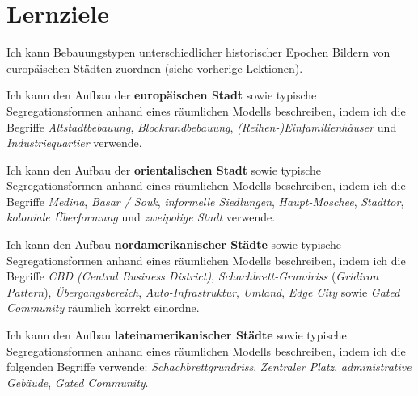 \newpage
\section{Lernziele}
\begin{todolist}
\item Ich kann Bebauungstypen unterschiedlicher historischer Epochen Bildern von europäischen Städten zuordnen (siehe vorherige Lektionen).
\item Ich kann den Aufbau der \textbf{europäischen Stadt} sowie typische Segregationsformen anhand eines räumlichen Modells beschreiben, indem ich die Begriffe \textit{Altstadtbebauung}, \textit{Blockrandbebauung}, \textit{(Reihen-)Einfamilienhäuser} und \textit{Industriequartier} verwende.
\item Ich kann den Aufbau der \textbf{orientalischen Stadt} sowie typische Segregationsformen anhand eines räumlichen Modells beschreiben, indem ich die Begriffe \textit{Medina}, \textit{Basar / Souk}, \textit{informelle Siedlungen}, \textit{Haupt-Moschee}, \textit{Stadttor}, \textit{koloniale Überformung} und \textit{zweipolige Stadt} verwende.
\item Ich kann den Aufbau \textbf{nordamerikanischer Städte} sowie typische Segregationsformen anhand eines räumlichen Modells beschreiben, indem ich die Begriffe \textit{CBD (Central Business District)}, \textit{Schachbrett-Grundriss} (\textit{Gridiron Pattern}), \textit{Übergangsbereich}, \textit{Auto-Infrastruktur}, \textit{Umland}, \textit{Edge City} sowie \textit{Gated Community} räumlich korrekt einordne.
\item Ich kann den Aufbau \textbf{lateinamerikanischer Städte} sowie typische Segregationsformen anhand eines räumlichen Modells beschreiben, indem ich die folgenden Begriffe verwende: \textit{Schachbrettgrundriss}, \textit{Zentraler Platz}, \textit{administrative Gebäude}, \textit{Gated Community}.
\end{todolist}

